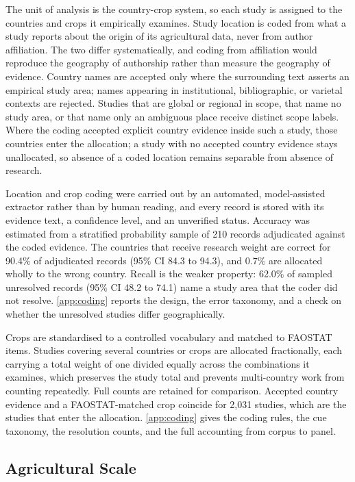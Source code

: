 \documentclass[ASNA,twocolumn]{USG}
\begin{document}
The unit of analysis is the country-crop system, so each study is assigned to the countries
and crops it empirically examines. Study location is coded from what a study reports about
the origin of its agricultural data, never from author affiliation. The two differ
systematically, and coding from affiliation would reproduce the geography of authorship
rather than measure the geography of evidence. Country names are accepted only where the
surrounding text asserts an empirical study area; names appearing in institutional,
bibliographic, or varietal contexts are rejected. Studies that are global or regional in scope, that name no study area, or that name only an
ambiguous place receive distinct scope labels. Where the coding accepted explicit
country evidence inside such a study, those countries enter the allocation; a study with no
accepted country evidence stays unallocated, so absence of a coded location remains separable
from absence of research.

Location and crop coding were carried out by an automated, model-assisted extractor rather than
by human reading, and every record is stored with its evidence text, a confidence level, and an
unverified status. Accuracy was estimated from a stratified probability sample of 210 records
adjudicated against the coded evidence. The countries that receive research weight are correct
for 90.4\% of adjudicated records (95\% CI 84.3 to 94.3), and 0.7\% are allocated wholly to the
wrong country. Recall is the weaker property: 62.0\% of sampled unresolved records (95\% CI 48.2
to 74.1) name a study area that the coder did not resolve. \ref{app:coding} reports the design,
the error taxonomy, and a check on whether the unresolved studies differ geographically.

Crops are standardised to a controlled vocabulary and matched to FAOSTAT items. Studies
covering several countries or crops are allocated fractionally, each carrying a total weight
of one divided equally across the combinations it examines, which preserves the study total
and prevents multi-country work from counting repeatedly. Full counts are retained for
comparison. Accepted country evidence and a FAOSTAT-matched crop coincide for 2,031 studies, which are
the studies that enter the allocation. \ref{app:coding} gives the coding rules, the cue
taxonomy, the resolution counts, and the full accounting from corpus to panel.

\subsection{Agricultural Scale}
\end{document}
